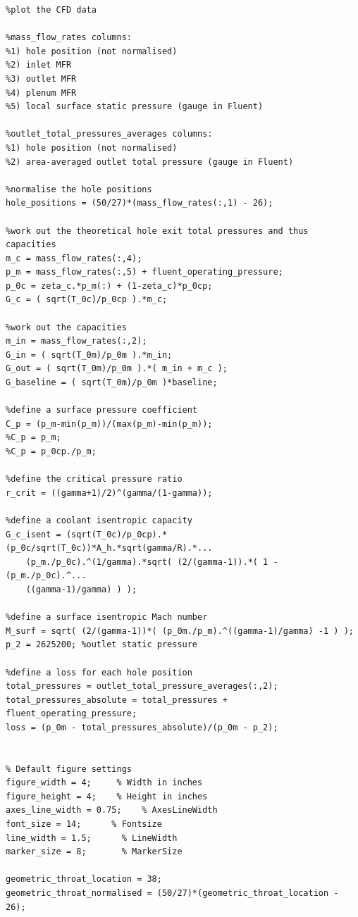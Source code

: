 \documentclass[a4paper, 11pt, oneside]{report}
\begin{document}
\begin{verbatim}
%plot the CFD data

%mass_flow_rates columns:
%1) hole position (not normalised)
%2) inlet MFR
%3) outlet MFR
%4) plenum MFR
%5) local surface static pressure (gauge in Fluent)

%outlet_total_pressures_averages columns:
%1) hole position (not normalised)
%2) area-averaged outlet total pressure (gauge in Fluent)

%normalise the hole positions
hole_positions = (50/27)*(mass_flow_rates(:,1) - 26);

%work out the theoretical hole exit total pressures and thus capacities
m_c = mass_flow_rates(:,4);
p_m = mass_flow_rates(:,5) + fluent_operating_pressure;
p_0c = zeta_c.*p_m(:) + (1-zeta_c)*p_0cp;
G_c = ( sqrt(T_0c)/p_0cp ).*m_c;

%work out the capacities
m_in = mass_flow_rates(:,2);
G_in = ( sqrt(T_0m)/p_0m ).*m_in;
G_out = ( sqrt(T_0m)/p_0m ).*( m_in + m_c );
G_baseline = ( sqrt(T_0m)/p_0m )*baseline;

%define a surface pressure coefficient
C_p = (p_m-min(p_m))/(max(p_m)-min(p_m));
%C_p = p_m;
%C_p = p_0cp./p_m;

%define the critical pressure ratio
r_crit = ((gamma+1)/2)^(gamma/(1-gamma));

%define a coolant isentropic capacity
G_c_isent = (sqrt(T_0c)/p_0cp).*(p_0c/sqrt(T_0c))*A_h.*sqrt(gamma/R).*...
    (p_m./p_0c).^(1/gamma).*sqrt( (2/(gamma-1)).*( 1 - (p_m./p_0c).^...
    ((gamma-1)/gamma) ) );

%define a surface isentropic Mach number
M_surf = sqrt( (2/(gamma-1))*( (p_0m./p_m).^((gamma-1)/gamma) -1 ) );
p_2 = 2625200; %outlet static pressure

%define a loss for each hole position
total_pressures = outlet_total_pressure_averages(:,2);
total_pressures_absolute = total_pressures + fluent_operating_pressure;
loss = (p_0m - total_pressures_absolute)/(p_0m - p_2);


% Default figure settings
figure_width = 4;     % Width in inches
figure_height = 4;    % Height in inches
axes_line_width = 0.75;    % AxesLineWidth
font_size = 14;      % Fontsize
line_width = 1.5;      % LineWidth
marker_size = 8;       % MarkerSize

geometric_throat_location = 38;
geometric_throat_normalised = (50/27)*(geometric_throat_location - 26);


\end{verbatim}
\end{document}
